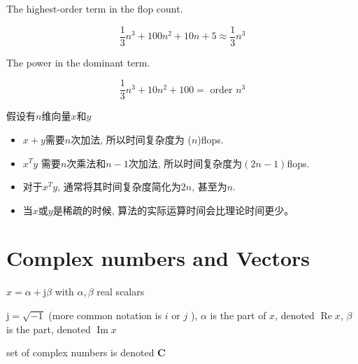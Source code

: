 \begin{definition}
    The highest-order term in the flop count.

\end{definition}

\begin{example}
    $$
\frac{1}{3} n^{3}+100 n^{2}+10 n+5 \approx \frac{1}{3} n^{3}
$$
\end{example}

\begin{definition}[Order]
    The power in the dominant term.
\end{definition}

\begin{example}
    $$
\frac{1}{3} n^{3}+10 n^{2}+100=\text { order } n^{3}
$$
\end{example}


\begin{corollary}
    假设有$n$维向量$x$和$y$

    \begin{itemize}
        \item $x+y$需要$n$次加法, 所以时间复杂度为 ($n$)flops. 
        \item $x^T y$ 需要$n$次乘法和$n - 1$次加法, 所以时间复杂度为$(2n - 1)$flops. 
        \item 对于$x^T y$, 通常将其时间复杂度简化为$2n$, 甚至为$n$. 
        \item 当$x$或$y$是稀疏的时候, 算法的实际运算时间会比理论时间更少。 
    \end{itemize}
\end{corollary}


\section{Complex numbers and Vectors}

\begin{definition}
    $ x=\alpha+\mathrm{j} \beta $ with $ \alpha, \beta $ real scalars

    $ \mathrm{j}=\sqrt{-1} $ (more common notation is $ i $ or $ j $ ), $ \alpha $ is the  part of $ x $, denoted $ \operatorname{Re} x $, $ \beta $ is the  part, denoted $ \operatorname{Im} x $
\end{definition}

\begin{definition}
    set of complex numbers is denoted $ \mathbf{C} $
\end{definition}

